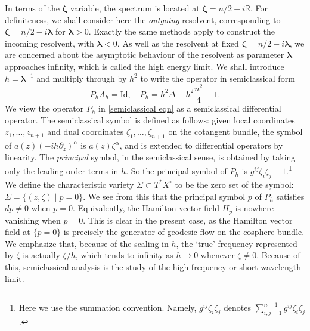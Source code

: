 \documentclass[10pt, a4paper, twoside]{amsart}
\numberwithin{equation}{section}
\theoremstyle{remark}
\begin{document}
In terms of the ${{\boldsymbol\zeta
}}$ variable, the spectrum is located at ${{\boldsymbol\zeta
}} = n/2 + i {\mathbb{R}}$. For definiteness, we shall consider here the \emph{outgoing} resolvent, corresponding to ${{\boldsymbol\zeta
}} = n/2 - i{{\boldsymbol\lambda}}$ for ${{\boldsymbol\lambda}} > 0$. Exactly the same methods apply to construct the incoming resolvent, with ${{\boldsymbol\lambda}} < 0$. 
As well as the resolvent at fixed ${{\boldsymbol\zeta
}} = n/2 - i {{\boldsymbol\lambda}}$, we are concerned about the asymptotic behaviour of the resolvent as parameter ${{\boldsymbol\lambda}}$ approaches infinity, which is called the high energy limit. We shall introduce $h = {{\boldsymbol\lambda}}^{-1}$ and multiply through by $h^2$ to write the operator in semiclassical form
\begin{equation}\label{semiclassical eqn}
 P_h A_h = {\mathrm{Id}}, \quad P_h = h^2 \Delta - h^2 \frac{n^2}{4} - 1.
\end{equation}
We view the operator $P_h$ in \eqref{semiclassical eqn} as a semiclassical differential operator. The semiclassical symbol is defined as follows: given local coordinates $z_1, \dots, z_{n+1}$ and dual coordinates $\zeta_1, \dots, \zeta_{n+1}$ on the cotangent bundle, the symbol of $a(z)(-i h \partial_{z})^\alpha$ is $a(z)\zeta^\alpha$, and is extended to differential operators by linearity. The \emph{principal} symbol, in the semiclassical sense, is obtained by taking only the leading order terms in $h$. So the principal symbol of $P_h$ is $g^{ij} \zeta_i \zeta_j  - 1$.\footnote{Here we use the summation convention. Namely, $g^{ij} \zeta_i \zeta_j$ denotes $\sum_{i, j = 1}^{n + 1}g^{ij} \zeta_i \zeta_j$.}
We define the characteristic variety $\Sigma \subset T^* X^\circ$ to be the zero set of the symbol: $\Sigma = \{ (z, \zeta) \mid p = 0 \}$.
We see from this that the principal symbol $p$ of $P_h$ satisfies $dp \neq 0$ when $p = 0$. Equivalently, the Hamilton vector field $H_p$ is nowhere vanishing when $p=0$. This is clear in the present case, as the Hamilton vector field at $\{ p = 0\}$  is precisely the generator of geodesic flow on the cosphere bundle.
We emphasize that, because of the scaling in $h$, the `true' frequency represented by $\zeta$ is actually $\zeta/h$, which tends to infinity as $h \to 0$ whenever $\zeta \neq 0$. Because of this, semiclassical analysis is the study of the high-frequency or short wavelength limit.
\end{document}
